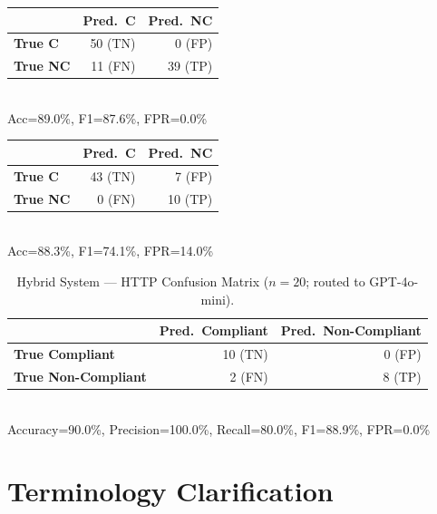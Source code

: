 \documentclass[11pt,a4paper]{article}
\begin{document}
\noindent
\begin{minipage}[t]{0.47\linewidth}
\centering
{}
\label{tab:cm-ssh}
\begin{tabular}{lrr}
\toprule
& \textbf{Pred.\ C} & \textbf{Pred.\ NC} \\
\midrule
\textbf{True C}  & 50 (TN) &  0 (FP) \\
\textbf{True NC} & 11 (FN) & 39 (TP) \\
\bottomrule
\end{tabular}\\[2pt]
\small Acc=89.0\%, F1=87.6\%, FPR=0.0\%
\end{minipage}%
\hfill
\begin{minipage}[t]{0.47\linewidth}
\centering
{}
\label{tab:cm-windows}
\begin{tabular}{lrr}
\toprule
& \textbf{Pred.\ C} & \textbf{Pred.\ NC} \\
\midrule
\textbf{True C}  & 43 (TN) &  7 (FP) \\
\textbf{True NC} &  0 (FN) & 10 (TP) \\
\bottomrule
\end{tabular}\\[2pt]
\small Acc=88.3\%, F1=74.1\%, FPR=14.0\%
\end{minipage}

\vspace{6pt}
\begin{table}[H]
\centering
\caption{Hybrid System — HTTP Confusion Matrix ($n=20$; routed to GPT-4o-mini).}
\label{tab:cm-http}
\begin{tabular}{lrr}
\toprule
& \textbf{Pred.\ Compliant} & \textbf{Pred.\ Non-Compliant} \\
\midrule
\textbf{True Compliant}     & 10 (TN) &  0 (FP) \\
\textbf{True Non-Compliant} &  2 (FN) &  8 (TP) \\
\bottomrule
\end{tabular}\\[2pt]
\small Accuracy=90.0\%, Precision=100.0\%, Recall=80.0\%, F1=88.9\%, FPR=0.0\%
\end{table}

\section{Terminology Clarification}
\label{sec:terminology}
\end{document}
